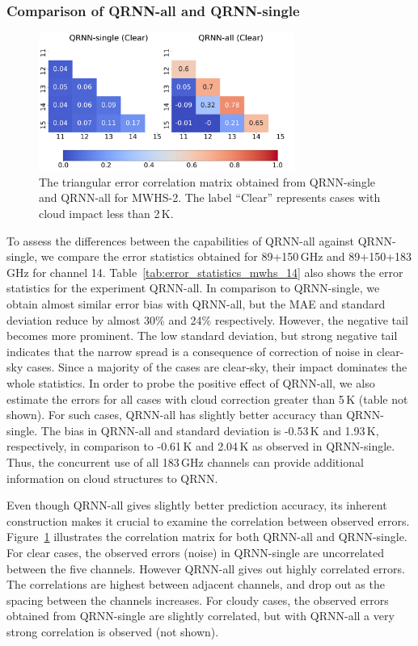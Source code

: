 \documentclass[amt, manuscript]{copernicus}
\begin{document}
\subsubsection{Comparison of QRNN-all and QRNN-single}
%
\begin{figure}[t]
	\centering
	\includegraphics[height=45mm]{Figures/correlation.pdf} 
	\caption{ The triangular error correlation matrix obtained from QRNN-single and QRNN-all for MWHS-2. The label ``Clear'' represents cases with cloud impact less than 2\,K.}
	\label{fig:correlations_mwhs}	
\end{figure}
To assess the differences between the capabilities of QRNN-all against QRNN-single, we  compare the error statistics obtained for 89+150\,GHz and 89+150+183\,GHz for channel 14.  Table~\ref{tab:error_statistics_mwhs_14} also shows the error statistics for the experiment QRNN-all. In comparison to QRNN-single, we obtain almost similar error bias with QRNN-all, but the MAE and standard deviation reduce by almost 30\% and 24\% respectively. However, the negative tail becomes more prominent. The low standard deviation, but strong negative tail indicates that the narrow spread is a consequence of correction of noise in clear-sky cases. Since a majority of the cases are clear-sky, their impact dominates the whole statistics. In order to probe the positive effect of QRNN-all, we also estimate the errors for all cases with cloud correction greater than 5\,K (table not shown). For such cases,  QRNN-all has slightly better accuracy than QRNN-single.   The bias in QRNN-all and standard deviation is -0.53\,K and 1.93\,K, respectively, in comparison to -0.61\,K and 2.04\,K as observed in QRNN-single. Thus, the concurrent use of all 183\,GHz channels can provide additional information on cloud structures to QRNN. 

Even though QRNN-all gives slightly better prediction accuracy, its inherent construction makes it crucial to examine the correlation between observed errors. Figure~\ref{fig:correlations_mwhs} illustrates the correlation matrix for both QRNN-all and QRNN-single. For clear cases, the observed errors (noise) in QRNN-single are uncorrelated between the five channels. However QRNN-all gives out highly correlated errors. The correlations are highest between adjacent channels, and drop out as the spacing between the channels increases. For cloudy cases, the observed errors obtained from QRNN-single are slightly correlated, but with QRNN-all a very strong correlation is observed (not shown). 
\end{document}
